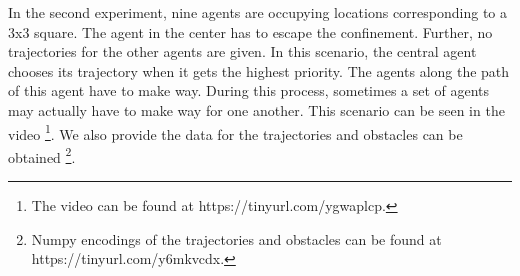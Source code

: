 In the second experiment, nine agents are occupying locations corresponding to a 3x3 square. The agent in the center has to escape the confinement. Further, no trajectories for the other agents are given. In this scenario, the central agent chooses its trajectory when it gets the highest priority. The agents along the path of this agent have to make way. During this process, sometimes a set of agents may actually have to make way for one another. This scenario can be seen in the video \footnote{The video can be found at https://tinyurl.com/ygwaplcp.}. We also provide the data for the trajectories and obstacles can be obtained \footnote{Numpy encodings of the trajectories and obstacles can be found at https://tinyurl.com/y6mkvcdx.}.


